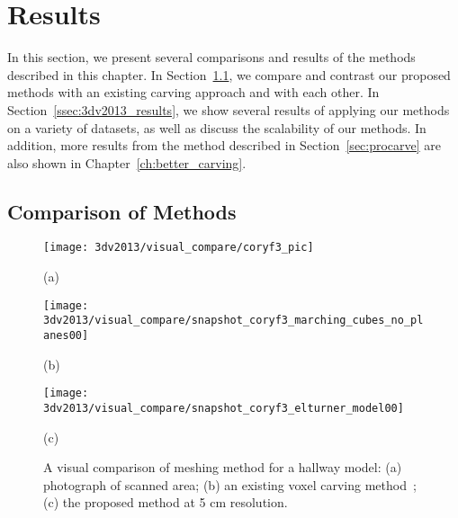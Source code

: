 \documentclass[12pt,onecolumn,oneside]{book}
\begin{document}
\section{Results}
\label{sec:carving_results}

In this section, we present several comparisons and results of the methods described in this chapter.  In Section~\ref{ssec:compare_3dv2013_procarve}, we compare and contrast our proposed methods with an existing carving approach and with each other.  In Section~\ref{ssec:3dv2013_results}, we show several results of applying our methods on a variety of datasets, as well as discuss the scalability of our methods.  In addition, more results from the method described in Section~\ref{sec:procarve} are also shown in Chapter~\ref{ch:better_carving}.

\subsection{Comparison of Methods}
\label{ssec:compare_3dv2013_procarve}

\begin{figure}
	
	\centering
	\begin{minipage}[b]{0.27\linewidth}
	\centerline{\texttt{[image: 3dv2013/visual\_compare/coryf3\_pic]}}
	\centerline{(a)}\medskip
	\end{minipage}
	\hfill
	\begin{minipage}[b]{0.35\linewidth}
	\centerline{\texttt{[image: 3dv2013/visual\_compare/snapshot\_coryf3\_marching\_cubes\_no\_planes00]}}
	\centerline{(b)}\medskip
	\end{minipage}
	\hfill
	\begin{minipage}[b]{0.35\linewidth}
	\centerline{\texttt{[image: 3dv2013/visual\_compare/snapshot\_coryf3\_elturner\_model00]}}
	\centerline{(c)}\medskip
	\end{minipage}

	\caption[Comparison between voxel carving methods.]{A visual comparison of meshing method for a hallway model:  (a) photograph of scanned area; (b) an existing voxel carving method~\cite{Carving}; (c) the proposed method at 5 cm resolution.}
	\label{fig:mc_compare}

\end{figure}
\end{document}
